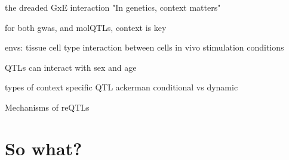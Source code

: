 \begin{outline}

\1 the dreaded GxE interaction
    \2 "In genetics, context matters"

    \2 for both gwas, and molQTLs, context is key

\1 envs: 
    \2 tissue
    \2 cell type
    \2 interaction between cells in vivo
    \2 stimulation conditions

\1 QTLs can interact with sex and age

\1 types of context specific QTL
    \2 ackerman conditional vs dynamic

\1 Mechanisms of reQTLs

\end{outline}

\section{So what?}

